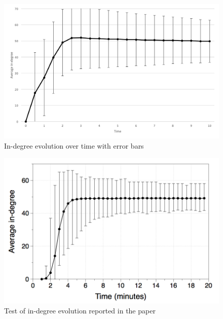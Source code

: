 \begin{figure}[ht]
  \centering
  \includegraphics[keepaspectratio=true, width=\textwidth]{images/indegree_evolution}\caption{In-degree evolution over time with error bars}
  \label{fig:indegree_evolution}
\end{figure}

\begin{figure}[ht]
  \centering
  \includegraphics[keepaspectratio=true, width=\textwidth]{images/paper_indegree_evolution}\caption{Test of in-degree evolution reported in the paper}
  \label{fig:paper_indegree_evolution}
\end{figure}

